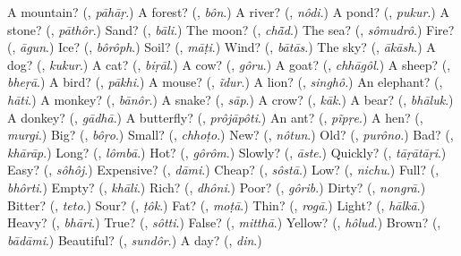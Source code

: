\begin{tcolorbox}[breakable,colback=teal!4,colframe=teal!35!black,title={Before you move on}]
A mountain? (\textbf{}, \emph{pāhāṛ}.) A forest? (\textbf{}, \emph{bôn}.) A river? (\textbf{}, \emph{nôdi}.) A pond? (\textbf{}, \emph{pukur}.) A stone? (\textbf{}, \emph{pāthôr}.) Sand? (\textbf{}, \emph{bāli}.) The moon? (\textbf{}, \emph{chā̃d}.) The sea? (\textbf{}, \emph{sômudrô}.) Fire? (\textbf{}, \emph{āgun}.) Ice? (\textbf{}, \emph{bôrôph}.) Soil? (\textbf{}, \emph{māṭi}.) Wind? (\textbf{}, \emph{bātās}.) The sky? (\textbf{}, \emph{ākāsh}.) A dog? (\textbf{}, \emph{kukur}.) A cat? (\textbf{}, \emph{biṛāl}.) A cow? (\textbf{}, \emph{gôru}.) A goat? (\textbf{}, \emph{chhāgôl}.) A sheep? (\textbf{}, \emph{bheṛā}.) A bird? (\textbf{}, \emph{pākhi}.) A mouse? (\textbf{}, \emph{ĩdur}.) A lion? (\textbf{}, \emph{singhô}.) An elephant? (\textbf{}, \emph{hāti}.) A monkey? (\textbf{}, \emph{bānôr}.) A snake? (\textbf{}, \emph{sāp}.) A crow? (\textbf{}, \emph{kāk}.) A bear? (\textbf{}, \emph{bhāluk}.) A donkey? (\textbf{}, \emph{gādhā}.) A butterfly? (\textbf{}, \emph{prôjāpôti}.) An ant? (\textbf{}, \emph{pĩpṛe}.) A hen? (\textbf{}, \emph{murgi}.) Big? (\textbf{}, \emph{bôṛo}.) Small? (\textbf{}, \emph{chhoṭo}.) New? (\textbf{}, \emph{nôtun}.) Old? (\textbf{}, \emph{purôno}.) Bad? (\textbf{}, \emph{khārāp}.) Long? (\textbf{}, \emph{lômbā}.) Hot? (\textbf{}, \emph{gôrôm}.) Slowly? (\textbf{}, \emph{āste}.) Quickly? (\textbf{}, \emph{tāṛātāṛi}.) Easy? (\textbf{}, \emph{sôhôj}.) Expensive? (\textbf{}, \emph{dāmi}.) Cheap? (\textbf{}, \emph{sôstā}.) Low? (\textbf{}, \emph{nichu}.) Full? (\textbf{}, \emph{bhôrti}.) Empty? (\textbf{}, \emph{khāli}.) Rich? (\textbf{}, \emph{dhôni}.) Poor? (\textbf{}, \emph{gôrib}.) Dirty? (\textbf{}, \emph{nongrā}.) Bitter? (\textbf{}, \emph{teto}.) Sour? (\textbf{}, \emph{ṭôk}.) Fat? (\textbf{}, \emph{moṭā}.) Thin? (\textbf{}, \emph{rogā}.) Light? (\textbf{}, \emph{hālkā}.) Heavy? (\textbf{}, \emph{bhāri}.) True? (\textbf{}, \emph{sôtti}.) False? (\textbf{}, \emph{mitthā}.) Yellow? (\textbf{}, \emph{hôlud}.) Brown? (\textbf{}, \emph{bādāmi}.) Beautiful? (\textbf{}, \emph{sundôr}.) A day? (\textbf{}, \emph{din}.)
\end{tcolorbox}
